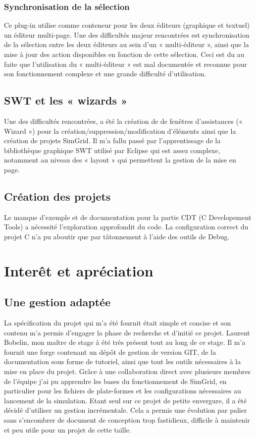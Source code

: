\documentclass{article}
\begin{document}
    	\subsubsection{Synchronisation de la sélection}
    		\label{selection}
    Ce plug-in utilise comme conteneur pour les deux éditeurs (graphique et textuel) un éditeur multi-page. Une des difficultés majeur rencontrées est synchronisation de la sélection entre les deux éditeurs au sein d'un « multi-éditeur », ainsi que la mise à jour des action disponibles en fonction de cette sélection. Ceci est du au faite que l'utilisation du « multi-éditeur » est mal documentée et reconnue pour son fonctionnement complexe et une grande difficulté d'utilisation.
    \subsection{SWT et les « wizards »}
    Une des difficultés rencontrées, a été la création de de fenêtres d'assistances (« Wizard ») pour la création/suppression/modification d'éléments ainsi que la création de projets SimGrid. Il m'a fallu passé par l'apprentissage de la bibliothèque graphique SWT utilisé par Eclipse qui est assez complexe, notamment au niveau des « layout » qui permettent la gestion de la mise en page.
    \subsection{Création des projets}
    	Le manque d'exemple et de documentation pour la partie CDT (C Developement Tools) a nécessité l'exploration approfondit du code. La configuration correct du projet C n'a pu aboutir que par tâtonnement à l'aide des outils de Debug.
        
\section{Interêt et apréciation}
    \subsection{Une gestion adaptée}
    La spécification du projet qui m'a été fournit était simple et concise et son contenu m'a permis d'engager la phase de recherche et d'initié ce projet. Laurent Bobelin, mon maître de stage à été très présent tout au long de ce stage. Il m'a fournit une forge contenant un dépôt de gestion de version GIT, de la documentation sous forme de tutoriel, ainsi que tout les outils nécessaires à la mise en place du projet. Grâce à une collaboration direct avec plusieurs membres de l'équipe j'ai pu apprendre les bases du fonctionnement de SimGrid, en particulier pour les fichiers de plate-formes et les configurations nécessaires au lancement de la simulation. Etant seul sur ce projet de petite envergure, il a été décidé d'utiliser un gestion incrémentale. Cela a permis une évolution par palier sans s'encombrer de document de conception trop fastidieux, difficile à maintenir et peu utile pour un projet de cette taille. 
\end{document}
